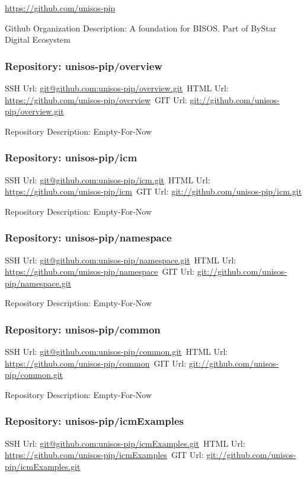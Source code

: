 \url{https://github.com/unisos-pip}

Github Organization Description: A foundation for BISOS. Part of ByStar Digital Ecosystem

\subsubsection{Repository: unisos-pip/overview}

SSH Url:  \url{git@github.com:unisos-pip/overview.git}\
HTML Url: \url{https://github.com/unisos-pip/overview}\
GIT Url:  \url{git://github.com/unisos-pip/overview.git}

Repository Description: Empty-For-Now

\subsubsection{Repository: unisos-pip/icm}

SSH Url:  \url{git@github.com:unisos-pip/icm.git}\
HTML Url: \url{https://github.com/unisos-pip/icm}\
GIT Url:  \url{git://github.com/unisos-pip/icm.git}

Repository Description: Empty-For-Now

\subsubsection{Repository: unisos-pip/namespace}

SSH Url:  \url{git@github.com:unisos-pip/namespace.git}\
HTML Url: \url{https://github.com/unisos-pip/namespace}\
GIT Url:  \url{git://github.com/unisos-pip/namespace.git}

Repository Description: Empty-For-Now

\subsubsection{Repository: unisos-pip/common}

SSH Url:  \url{git@github.com:unisos-pip/common.git}\
HTML Url: \url{https://github.com/unisos-pip/common}\
GIT Url:  \url{git://github.com/unisos-pip/common.git}

Repository Description: Empty-For-Now

\subsubsection{Repository: unisos-pip/icmExamples}

SSH Url:  \url{git@github.com:unisos-pip/icmExamples.git}\
HTML Url: \url{https://github.com/unisos-pip/icmExamples}\
GIT Url:  \url{git://github.com/unisos-pip/icmExamples.git}

